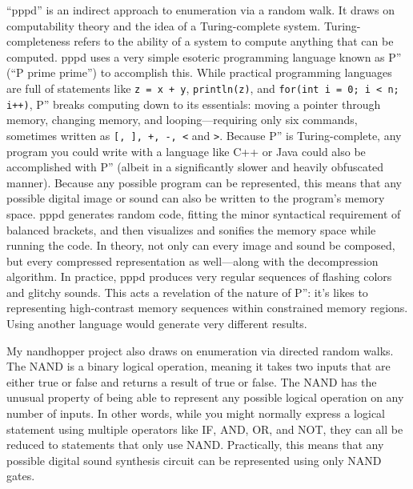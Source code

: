 \documentclass{thesis}
\begin{document}
	``pppd''\cite{kyle_mcdonald_pppd_2009} is an indirect approach to enumeration via a random walk. It draws on computability theory\cite{boolos_computability_2002} and the idea of a Turing-complete system. Turing-completeness refers to the ability of a system to compute anything that can be computed. pppd uses a very simple esoteric programming language known as P'' (``P prime prime'') to accomplish this. While practical programming languages are full of statements like \verb!z = x + y!, \verb!println(z)!, and \verb!for(int i = 0; i < n; i++)!, P'' breaks computing down to its essentials: moving a pointer through memory, changing memory, and looping---requiring only six commands, sometimes written as \verb![, ], +, -, <! and \verb!>!. Because P'' is Turing-complete, any program you could write with a language like C++ or Java could also be accomplished with P'' (albeit in a significantly slower and heavily obfuscated manner). Because any possible program can be represented, this means that any possible digital image or sound can also be written to the program's memory space. pppd generates random code, fitting the minor syntactical requirement of balanced brackets, and then visualizes and sonifies the memory space while running the code. In theory, not only can every image and sound be composed, but every compressed representation as well---along with the decompression algorithm. In practice, pppd produces very regular sequences of flashing colors and glitchy sounds. This acts a revelation of the nature of P'': it's likes to representing high-contrast memory sequences within constrained memory regions. Using another language would generate very different results.
	
	My nandhopper project\cite{kyle_mcdonald_nandhopper_2008} also draws on enumeration via directed random walks. The NAND is a binary logical operation, meaning it takes two inputs that are either true or false and returns a result of true or false. The NAND has the unusual property of being able to represent any possible logical operation on any number of inputs. In other words, while you might normally express a logical statement using multiple operators like IF, AND, OR, and NOT, they can all be reduced to statements that only use NAND. Practically, this means that any possible digital sound synthesis circuit can be represented using only NAND gates.
	
\end{document}
